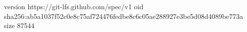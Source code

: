 version https://git-lfs.github.com/spec/v1
oid sha256:ab5a1037f52c0e8c75af724476fedbe8c6c05ae288927e3be5d08d4089be773a
size 87544
